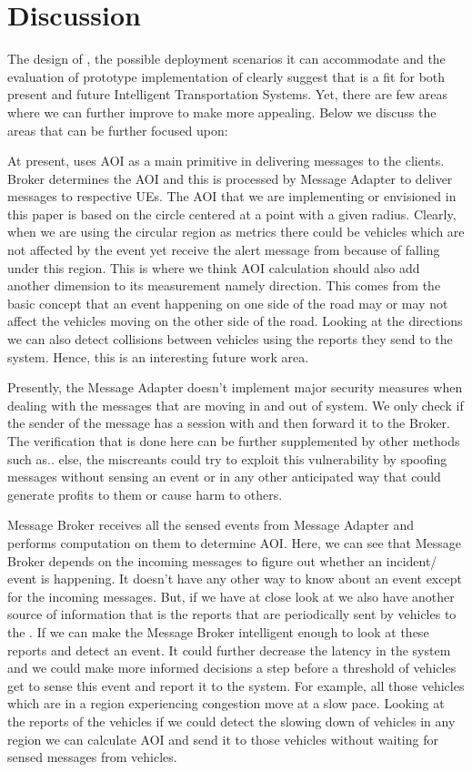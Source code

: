 \section{Discussion}

The design of \name, the possible deployment scenarios it can
accommodate and the evaluation of prototype implementation of \name
clearly suggest that \name is a fit for both present and future
Intelligent Transportation Systems. Yet, there are few areas where we
can further improve to make \name more appealing. Below we discuss
the areas that can be further focused upon:

At present, \name uses AOI as a main primitive in delivering
messages to the clients. \name Broker determines the AOI and this is
processed by Message Adapter to deliver messages to respective UEs.
The AOI that we are implementing or envisioned in this paper is based
on the circle centered at a point with a given radius. Clearly, when
we are using the circular region as metrics there could be vehicles
which are not affected by the event yet receive the alert message from
\name because of falling under this region. This is where we think
AOI calculation should also add another dimension to its measurement
namely direction. This comes from the basic concept that an event
happening on one side of the road may or may not affect the vehicles
moving on the other side of the road. Looking at the directions we can
also detect collisions between vehicles using the reports they send to
the system.  Hence, this is an interesting future work area.

Presently, the Message Adapter doesn't implement major security
measures when dealing with the messages that are moving in and out of
system. We only check if the sender of the message has a session with
\name and then forward it to the \name Broker. The verification
that is done here can be further supplemented by other methods such
as.. else, the miscreants could try to exploit this vulnerability by
spoofing messages without sensing an event or in any other anticipated
way that could generate profits to them or cause harm to others.

Message Broker receives all the sensed events from Message Adapter and
performs computation on them to determine AOI. Here, we can see that
Message Broker depends on the incoming messages to figure out whether
an incident/ event is happening. It doesn't have any other way to know
about an event except for the incoming messages. But, if we have at
close look at \name we also have another source of information that
is the reports that are periodically sent by vehicles to the
\name. If we can make the Message Broker intelligent enough to look
at these reports and detect an event. It could further decrease the
latency in the system and we could make more informed decisions a step
before a threshold of vehicles get to sense this event and report it
to the system. For example, all those vehicles which are in a region
experiencing congestion move at a slow pace. Looking at the reports of
the vehicles if we could detect the slowing down of vehicles in any
region we can calculate AOI and send it to those vehicles without
waiting for sensed messages from vehicles.

